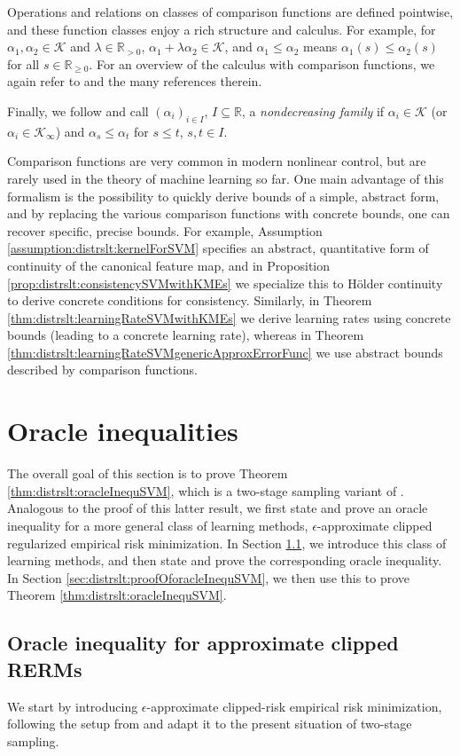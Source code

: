 \documentclass[letterpaper]{article} %
\newcommand{\R}{\mathbb{R}}
\newcommand{\Rnn}{\R_{\geq 0}}
\newcommand{\Rp}{\R_{> 0}}
\newcommand{\cK}{\mathcal{K}} %
\newcommand{\cKi}{\cK_\infty} %
\newcommand{\defm}[1]{\emph{#1}}
\begin{document}
Operations and relations on classes of comparison functions are defined pointwise, and these function classes enjoy a rich structure and calculus.
For example, for $\alpha_1,\alpha_2\in\cK$ and $\lambda\in\Rp$, $\alpha_1 + \lambda \alpha_2 \in \cK$,
and $\alpha_1 \leq \alpha_2$ means $\alpha_1(s) \leq \alpha_2(s)$ for all $s\in\Rnn$.
For an overview of the calculus with comparison functions, we again refer to \cite{kellett2014compendium} and the many references therein.

Finally, we follow \cite{fiedler2024statistical} and call $(\alpha_i)_{i\in I}$, $I\subseteq\R$, a \defm{nondecreasing family} if $\alpha_i \in \cK$ (or $\alpha_i\in\cKi$) and $\alpha_s \leq \alpha_t$ for $s\leq t$, $s,t\in I$.

Comparison functions are very common in modern nonlinear control, but are rarely used in the theory of machine learning so far.
One main advantage of this formalism is the possibility to quickly derive bounds of a simple, abstract form, and by replacing the various comparison functions with concrete bounds, one can recover specific, precise bounds.
For example, Assumption \ref{assumption:distrslt:kernelForSVM} specifies an abstract, quantitative form of continuity of the canonical feature map, and in Proposition \ref{prop:distrslt:consistencySVMwithKMEs} we specialize this to Hölder continuity to derive concrete conditions for consistency.
Similarly, in Theorem \ref{thm:distrslt:learningRateSVMwithKMEs} we derive learning rates using concrete bounds (leading to a concrete learning rate), whereas in Theorem \ref{thm:distrslt:learningRateSVMgenericApproxErrorFunc} we use abstract bounds described by comparison functions.
\section{Oracle inequalities}
The overall goal of this section is to prove Theorem \ref{thm:distrslt:oracleInequSVM}, which is a two-stage sampling variant of \cite[Theorem~7.22]{SC08}.
Analogous to the proof of this latter result, we first state and prove an oracle inequality for a more general class of learning methods, $\epsilon$-approximate clipped regularized empirical risk minimization.
In Section \ref{sec:distrslt:oraceInequalityCRERM}, we introduce this class of learning methods, and then state and prove the corresponding oracle inequality.
In Section \ref{sec:distrslt:proofOforacleInequSVM}, we then use this to prove Theorem \ref{thm:distrslt:oracleInequSVM}.
\subsection{Oracle inequality for approximate clipped RERMs} \label{sec:distrslt:oraceInequalityCRERM}
We start by introducing $\epsilon$-approximate clipped-risk empirical risk minimization, following the setup from \cite[Section~7.4]{SC08} and adapt it to the present situation of two-stage sampling.
\end{document}
